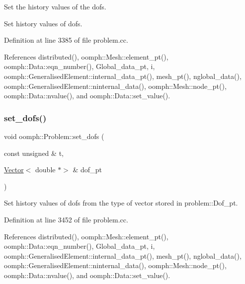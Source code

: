 Set the history values of the dofs. 

Set history values of dofs. 

Definition at line 3385 of file problem.\+cc.



References distributed(), oomph\+::\+Mesh\+::element\+\_\+pt(), oomph\+::\+Data\+::eqn\+\_\+number(), Global\+\_\+data\+\_\+pt, i, oomph\+::\+Generalised\+Element\+::internal\+\_\+data\+\_\+pt(), mesh\+\_\+pt(), nglobal\+\_\+data(), oomph\+::\+Generalised\+Element\+::ninternal\+\_\+data(), oomph\+::\+Mesh\+::node\+\_\+pt(), oomph\+::\+Data\+::nvalue(), and oomph\+::\+Data\+::set\+\_\+value().

\mbox{\label{classoomph_1_1Problem_ac99c82660395bd5f63888e21f9c2002f}} 
\subsubsection{\texorpdfstring{set\+\_\+dofs()}{set\_dofs()}\hspace{0.1cm}{\footnotesize\ttfamily [3/3]}}
{\footnotesize\ttfamily void oomph\+::\+Problem\+::set\+\_\+dofs (\begin{DoxyParamCaption}\item[{const unsigned \&}]{t,  }\item[{\hyperlink{classoomph_1_1Vector}{Vector}$<$ double $\ast$$>$ \&}]{dof\+\_\+pt }\end{DoxyParamCaption})}

Set history values of dofs from the type of vector stored in problem\+::\+Dof\+\_\+pt. 

Definition at line 3452 of file problem.\+cc.



References distributed(), oomph\+::\+Mesh\+::element\+\_\+pt(), oomph\+::\+Data\+::eqn\+\_\+number(), Global\+\_\+data\+\_\+pt, i, oomph\+::\+Generalised\+Element\+::internal\+\_\+data\+\_\+pt(), mesh\+\_\+pt(), nglobal\+\_\+data(), oomph\+::\+Generalised\+Element\+::ninternal\+\_\+data(), oomph\+::\+Mesh\+::node\+\_\+pt(), oomph\+::\+Data\+::nvalue(), and oomph\+::\+Data\+::set\+\_\+value().

\mbox{\label{classoomph_1_1Problem_a4cf44478e6f6abe95063b7bb2dd530a0}} 
